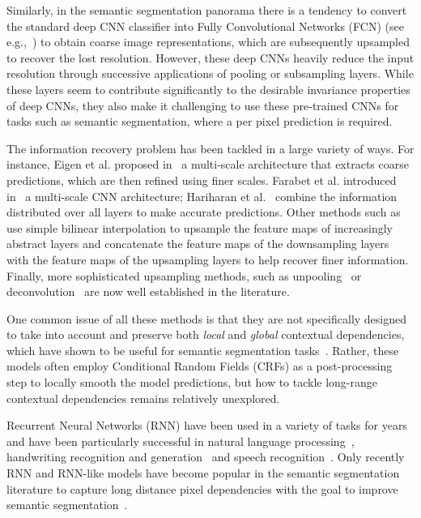 Similarly, in the semantic segmentation panorama there is a tendency to convert
the standard deep CNN classifier into Fully Convolutional Networks (FCN) (see
e.g.,~\cite{long2014fully,noh2015learning, badrinarayanan2015segnet,
Ronneberger2015}) to obtain coarse image representations, which are
subsequently upsampled to recover the lost resolution. However, these deep CNNs
heavily reduce the input resolution through successive applications of pooling
or subsampling layers. While these layers seem to contribute significantly to
the desirable invariance properties of deep CNNs, they also make it challenging
to use these pre-trained CNNs for tasks such as semantic segmentation, where a
per pixel prediction is required.

The information recovery problem has been tackled in a large variety of ways.
For instance, Eigen et al. proposed in~\cite{Eigen2015} a multi-scale
architecture that extracts coarse predictions, which are then refined using
finer scales. Farabet et al. introduced in~\cite{Farabet:2013} a multi-scale
CNN architecture; Hariharan et al.~\cite{Hariharan2015} combine the information
distributed over all layers to make accurate predictions. Other methods such
as~\cite{long2014fully,badrinarayanan2015segnet} use simple bilinear
interpolation to upsample the feature maps of increasingly abstract layers and
\cite{Ronneberger2015} concatenate the feature maps of the downsampling layers
with the feature maps of the upsampling layers to help recover finer
information. Finally, more sophisticated upsampling methods, such as
unpooling~\cite{noh2015learning,badrinarayanan2015segnet} or
deconvolution~\cite{long2014fully} are now well established in the literature.

One common issue of all these methods is that they are not specifically
designed to take into account and preserve both \emph{local} and \emph{global}
contextual dependencies, which have shown to be useful for semantic
segmentation tasks~\cite{Singh2013,Gatta14-deepvision}. Rather, these models
often employ Conditional Random Fields (CRFs) as a post-processing step to
locally smooth the model predictions, but how to tackle long-range contextual
dependencies remains relatively unexplored.

Recurrent Neural Networks (RNN) have been used in a variety of tasks for years
and have been particularly successful in natural language
processing~\citep[see, e.g.,][]{Mikolov-thesis-2012,Sutskever-et-al-NIPS2014,
Cho2014}, handwriting recognition and generation~\citep{Graves+Schmidhuber-2009,
Graves-et-al-NIPS2007,Graves-arxiv2013} and speech recognition~\citep{
Chorowski-et-al-arxiv2014,Graves+Jaitly-ICML2014}. Only recently RNN and
RNN-like models have become popular in the semantic segmentation literature to
capture long distance pixel dependencies with the goal to improve semantic
segmentation~\cite{Pinheiro:2014,Gatta14-deepvision,chen2015semantic,
byeon2015scene,stollenga2015parallel}.

